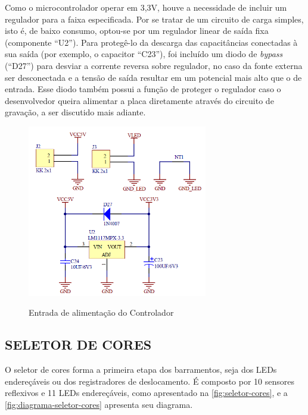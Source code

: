 Como o microcontrolador operar em 3,3V, houve a necessidade de incluir um regulador para a faixa especificada. Por se tratar de um circuito de carga simples, isto é, de baixo consumo, optou-se por um regulador linear de saída fixa (componente ``U2''). Para protegê-lo da descarga das capacitâncias conectadas à sua saída (por exemplo, o capacitor ``C23''), foi incluído um diodo de \emph{bypass} (``D27'') para desviar a corrente reversa sobre regulador, no caso da fonte externa ser desconectada e a tensão de saída resultar em um potencial mais alto que o de entrada. Esse diodo também possui a função de proteger o regulador caso o desenvolvedor queira alimentar a placa diretamente através do circuito de gravação, a ser discutido mais adiante.

\begin{figure}[H]
    \centering
    \caption{Entrada de alimentação do Controlador}
    \includegraphics[width=0.7\textwidth]{./dados/figuras/alimentacao-controlador}
    \label{fig:alimentacao-controlador}
\end{figure}

\subsection{SELETOR DE CORES}
\label{subse:seletor}

O seletor de cores forma a primeira etapa dos barramentos, seja dos LEDs endereçáveis ou dos registradores de deslocamento. É composto por 10 sensores reflexivos e 11 LEDs endereçáveis, como apresentado na \autoref{fig:seletor-cores}, e a \autoref{fig:diagrama-seletor-cores} apresenta seu diagrama.


